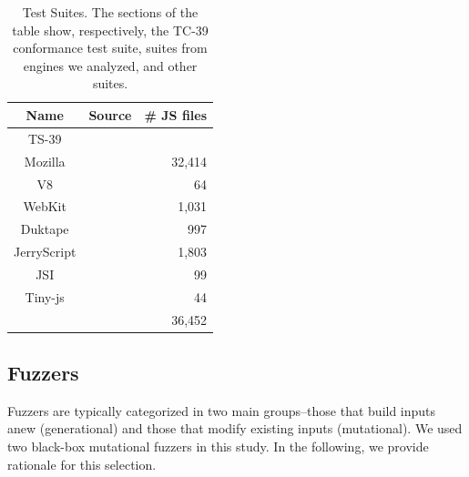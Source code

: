 \documentclass[10pt,conference,anonymous]{IEEEtran}
\begin{document}
\begin{table}[t]
  \centering
  \caption{\label{tab:test-suites}Test Suites. The sections of the
    table show, respectively, the TC-39 conformance test suite, suites
    from engines we analyzed, and other suites.}
  \begin{tabular}{ccr}
    \toprule
    Name & Source & \# JS files \\
    \midrule
    TS-39 & \cite{ecma262-conformance-suite} & \Fix{-} \\
    \midrule
    Mozilla & \cite{mozilla} & 32,414 \\
    V8 & \cite{v8} & 64 \\
    WebKit & \cite{webkit} & 1,031 \\
    \midrule    
    Duktape & \cite{duktape} & 997 \\
    JerryScript & \cite{jerryscript} & 1,803 \\
    JSI & \cite{jsi} & 99 \\
    Tiny-js & \cite{tinyjs} & 44 \\    
    \midrule
     &  & 36,452 \\
   \bottomrule     
  \end{tabular}
\end{table}


\subsection{Fuzzers}
\label{sec:objects:fuzzers}


Fuzzers are typically categorized in two main groups--those that build
inputs anew (generational) and those that modify existing inputs
(mutational). We used two black-box mutational
fuzzers
in this study. In the following, we provide rationale for this
selection.
\end{document}
